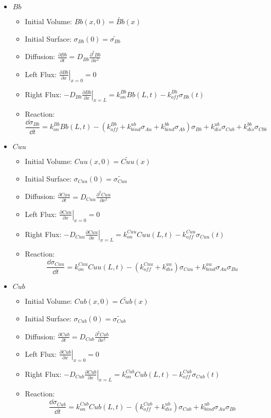 \documentclass[aps, prl, preprint]{revtex4-1}
\begin{document}
\begin{itemize}
\begin{itemize}
	\end{itemize}

\item $Bb$
	\begin{itemize}
		\item Initial Volume: $Bb(x,0) = \widetilde{Bb}(x)$
		\item Initial Surface: $\sigma_{Bb}(0) = \widetilde{\sigma_{Bb}}$
		\item Diffusion: $\frac{\partial Bb}{\partial t} = D_{Bb}\frac{\partial^2Bb}{\partial x^2}$
		\item Left Flux: $\left . \frac{\partial Bb}{\partial x}\right | _{x=0} = 0$
		\item Right Flux: $\left . -D_{Bb}\frac{\partial Bb}{\partial x}\right |_{x=L} =k_{on}^{Bb}Bb(L,t) - k_{off}^{Bb}\sigma_{Bb}(t)$
		\item Reaction: $$\frac{\dd \sigma_{Bb}}{\dd t}=k_{on}^{Bb}Bb(L,t)-(k_{off}^{Bb}+k_{bind}^{ub}\sigma_{Au}+k_{bind}^{bb}\sigma_{Ab})\sigma_{Bb}+k_{dis}^{ub}\sigma_{Cub}+k_{dis}^{bb}\sigma_{Cbb}$$
	
	\end{itemize}

\item $Cuu$
	\begin{itemize}
		\item Initial Volume: $Cuu(x,0) = \widetilde{Cuu}(x)$
		\item Initial Surface: $\sigma_{Cuu}(0) = \widetilde{\sigma_{Cuu}}$
		\item Diffusion: $\frac{\partial Cuu}{\partial t} = D_{Cuu}\frac{\partial^2Cuu}{\partial x^2}$
		\item Left Flux: $\left . \frac{\partial Cuu}{\partial x}\right | _{x=0} = 0$
		\item Right Flux: $\left . -D_{Cuu}\frac{\partial Cuu}{\partial x}\right |_{x=L} =k_{on}^{Cuu}Cuu(L,t) - k_{off}^{Cuu}\sigma_{Cuu}(t)$
		\item Reaction: $$\frac{\dd \sigma_{Cuu}}{\dd t}=k_{on}^{Cuu}Cuu(L,t)-(k_{off}^{Cuu}+k_{dis}^{uu})\sigma_{Cuu}+k_{bind}^{uu}\sigma_{Au}\sigma_{Bu}$$
	
	\end{itemize}

\item $Cub$
	\begin{itemize}
		\item Initial Volume: $Cub(x,0) = \widetilde{Cub}(x)$
		\item Initial Surface: $\sigma_{Cub}(0) = \widetilde{\sigma_{Cub}}$
		\item Diffusion: $\frac{\partial Cub}{\partial t} = D_{Cub}\frac{\partial^2Cub}{\partial x^2}$
		\item Left Flux: $\left . \frac{\partial Cub}{\partial x}\right | _{x=0} = 0$
		\item Right Flux: $\left . -D_{Cub}\frac{\partial Cub}{\partial x}\right |_{x=L} =k_{on}^{Cub}Cub(L,t) - k_{off}^{Cub}\sigma_{Cub}(t)$
		\item Reaction: $$\frac{\dd \sigma_{Cub}}{\dd t}=k_{on}^{Cub}Cub(L,t)-(k_{off}^{Cub}+k_{dis}^{ub})\sigma_{Cub}+k_{bind}^{ub}\sigma_{Au}\sigma_{Bb}$$
	

\end{itemize}
\end{itemize}
\end{document}
